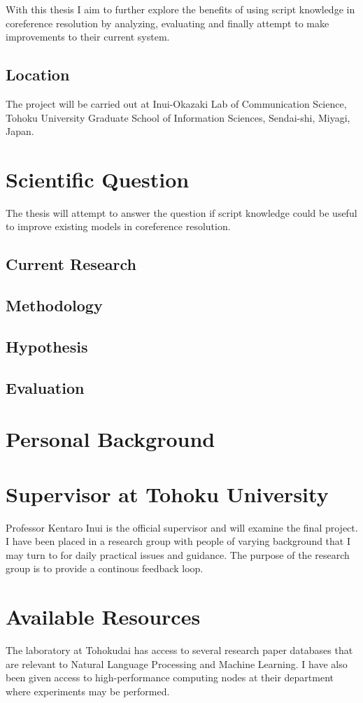 \documentclass{article}
\begin{document}
With this thesis I aim to further explore the benefits of using script knowledge in coreference resolution by analyzing, evaluating and finally attempt to make improvements to their current system.
\subsection{Location}
The project will be carried out at Inui-Okazaki Lab of Communication Science, Tohoku University Graduate School of Information Sciences, Sendai-shi, Miyagi, Japan.
\section{Scientific Question}
The thesis will attempt to answer the question if script knowledge could be useful to improve existing models in coreference resolution.
\subsection{Current Research}

\subsection{Methodology}

\subsection{Hypothesis}

\subsection{Evaluation}

\section{Personal Background}

\section{Supervisor at Tohoku University}
Professor Kentaro Inui is the official supervisor and will examine the final project. I have been placed in a research group with people of varying background that I may turn to for daily practical issues and guidance. The purpose of the research group is to provide a continous feedback loop.

\section{Available Resources}
The laboratory at Tohokudai has access to several research paper databases that are relevant to Natural Language Processing and Machine Learning. I have also been given access to high-performance computing nodes at their department where experiments may be performed.
\end{document}
